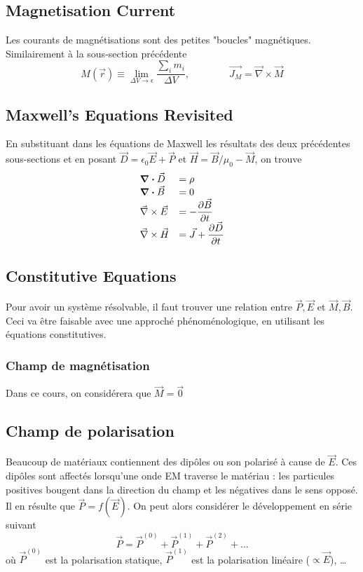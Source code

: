 \subsection{Magnetisation Current}
Les courants de magnétisations sont des petites "boucles" magnétiques. Similairement à la 
sous-section précédente
\begin{equation}
M(\vec{r}) \equiv\lim\limits_{\Delta V\to \epsilon} \dfrac{\sum_i m_i}{\Delta V},\qquad
\qquad\vec{J_M} = \vec{\nabla}\times\vec{M}
\end{equation}

\subsection{Maxwell’s Equations Revisited}
En substituant dans les équations de Maxwell les résultats des deux précédentes sous-sections 
et en posant $\vec{D} = \epsilon_0\vec{E}+\vec{P}$ et $\vec H = \vec B/\mu_0-\vec{M}$, on 
trouve
\begin{equation}
\begin{array}{ll}
\div\vec{D} &=\rho\\
\div\vec{B} &= 0\\
\vec\nabla\times\vec{E} &=-\dfrac{\partial\vec{B}}{\partial t}\\
\vec\nabla\times\vec{H} &= \displaystyle \vec{J}+\dfrac{\partial \vec{D}}{\partial t}
\end{array}
\end{equation}



\subsection{Constitutive Equations}
Pour avoir un système résolvable, il faut trouver une relation entre $\vec{P}, \vec{E}$ et 
$\vec{M},\vec{B}$. Ceci va être faisable avec une approché phénoménologique, en utilisant les 
équations constitutives. 

	\subsubsection{Champ de magnétisation}
	Dans ce cours, on considérera que $\vec{M} = \vec{0}$

	\subsection{Champ de polarisation}
	Beaucoup de matériaux contiennent des dipôles ou son polarisé à cause de $\vec{E}$. Ces 
	dipôles sont affectés lorsqu'une onde EM traverse le matériau : les particules positives
	bougent dans la direction du champ et les négatives dans le sens opposé. Il en résulte que
	$\vec{P} = f(\vec{E})$. On peut alors considérer le développement en série suivant 
	\begin{equation}
	\vec{P} = \vec{P}^{(0)}+\vec{P}^{(1)}+\vec{P}^{(2)}+\dots 
	\end{equation}
	où $\vec{P}^{(0)}$ est la polarisation statique, $\vec{P}^{(1)}$ est la polarisation 
	linéaire ($\propto \vec{E}$), \dots\\
	
